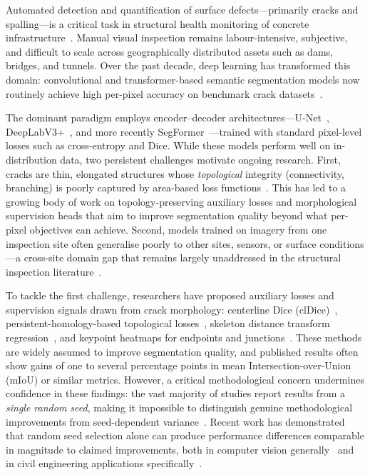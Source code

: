 \documentclass[preprint,12pt]{elsarticle}
\begin{document}
Automated detection and quantification of surface defects---primarily cracks and spalling---is a critical task in structural health monitoring of concrete infrastructure~\cite{koch2015review, mosalam2024dlshm}. Manual visual inspection remains labour-intensive, subjective, and difficult to scale across geographically distributed assets such as dams, bridges, and tunnels. Over the past decade, deep learning has transformed this domain: convolutional and transformer-based semantic segmentation models now routinely achieve high per-pixel accuracy on benchmark crack datasets~\cite{kulkarni2022crackseg9k, dorafshan2018sdnet, zhang2025crackreview}.

The dominant paradigm employs encoder--decoder architectures---U-Net~\cite{ronneberger2015unet}, DeepLabV3+~\cite{chen2018deeplabv3plus}, and more recently SegFormer~\cite{xie2021segformer}---trained with standard pixel-level losses such as cross-entropy and Dice. While these models perform well on in-distribution data, two persistent challenges motivate ongoing research. First, cracks are thin, elongated structures whose \emph{topological} integrity (connectivity, branching) is poorly captured by area-based loss functions~\cite{shit2021cldice, hu2019topology}. This has led to a growing body of work on topology-preserving auxiliary losses and morphological supervision heads that aim to improve segmentation quality beyond what per-pixel objectives can achieve. Second, models trained on imagery from one inspection site often generalise poorly to other sites, sensors, or surface conditions---a cross-site domain gap that remains largely unaddressed in the structural inspection literature~\cite{bukhsh2021damage, hassani2025dashm}.

To tackle the first challenge, researchers have proposed auxiliary losses and supervision signals drawn from crack morphology: centerline Dice (clDice)~\cite{shit2021cldice}, persistent-homology-based topological losses~\cite{clough2020topological, hu2019topology}, skeleton distance transform regression~\cite{audebert2019distance}, and keypoint heatmaps for endpoints and junctions~\cite{sun2019crackjunction}. These methods are widely assumed to improve segmentation quality, and published results often show gains of one to several percentage points in mean Intersection-over-Union (mIoU) or similar metrics. However, a critical methodological concern undermines confidence in these findings: the vast majority of studies report results from a \emph{single random seed}, making it impossible to distinguish genuine methodological improvements from seed-dependent variance~\cite{picard2021seed, henderson2018rl}. Recent work has demonstrated that random seed selection alone can produce performance differences comparable in magnitude to claimed improvements, both in computer vision generally~\cite{picard2021seed} and in civil engineering applications specifically~\cite{alsabbagh2024randomness}.
\end{document}
